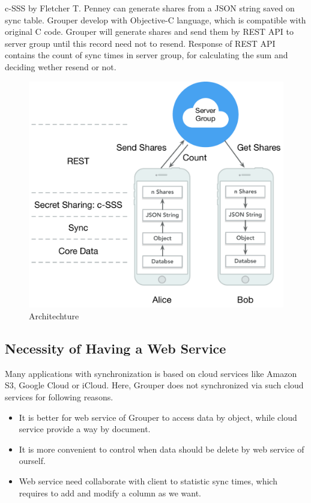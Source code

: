 \documentclass[twocolumn,10pt]{article}
\begin{document}
c-SSS by Fletcher T. Penney can generate shares from a JSON string saved on sync table. Grouper develop with Objective-C language, which is compatible with original C code. Grouper will generate shares and send them by REST API to server group until this record need not to resend. Response of REST API contains the count of sync times in server group, for calculating the sum and deciding wether resend or not.

\begin{figure}[t]
\centering
\includegraphics[scale=0.4]{architechture}
\caption{Architechture}
\end{figure}

\subsection{Necessity of Having a Web Service}
Many applications with synchronization is based on cloud services like Amazon S3, Google Cloud or iCloud. Here, Grouper does not synchronized via such cloud services for following reasons.
\begin{itemize}
\setlength{\itemsep}{1pt}
\setlength{\parskip}{0pt}
\setlength{\parsep}{0pt}
    \item It is better for web service of Grouper to access data by object, while cloud service provide a way by document. 
    \item It is more convenient to control when data should be delete by web service of ourself.
    \item Web service need collaborate with client to statistic sync times, which requires to add and modify a column as we want.
\end{itemize}
\end{document}
